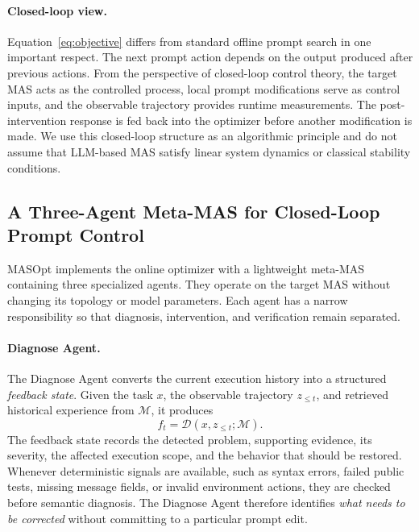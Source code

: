 \paragraph{Closed-loop view.}
Equation~\ref{eq:objective} differs from standard offline prompt search in one important respect.
The next prompt action depends on the output produced after previous actions.
From the perspective of closed-loop control theory, the target MAS acts as the controlled process, local prompt modifications serve as control inputs, and the observable trajectory provides runtime measurements.
The post-intervention response is fed back into the optimizer before another modification is made.
We use this closed-loop structure as an algorithmic principle and do not assume that LLM-based MAS satisfy linear system dynamics or classical stability conditions.


\subsection{A Three-Agent Meta-MAS for Closed-Loop Prompt Control}
\label{sec:meta_agents}

MASOpt implements the online optimizer with a lightweight meta-MAS containing three specialized agents.
They operate on the target MAS without changing its topology or model parameters.
Each agent has a narrow responsibility so that diagnosis, intervention, and verification remain separated.

\paragraph{\textbf{Diagnose Agent.}}
The Diagnose Agent converts the current execution history into a structured \emph{feedback state}.
Given the task $x$, the observable trajectory $z_{\leq t}$, and retrieved historical experience from $\mathcal{M}$, it produces
\begin{equation}
    f_t =
    \mathcal{D}
    \left(
        x,z_{\leq t};\mathcal{M}
    \right).
    \label{eq:diagnose}
\end{equation}
The feedback state records the detected problem, supporting evidence, its severity, the affected execution scope, and the behavior that should be restored.
Whenever deterministic signals are available, such as syntax errors, failed public tests, missing message fields, or invalid environment actions, they are checked before semantic diagnosis.
The Diagnose Agent therefore identifies \emph{what needs to be corrected} without committing to a particular prompt edit.

